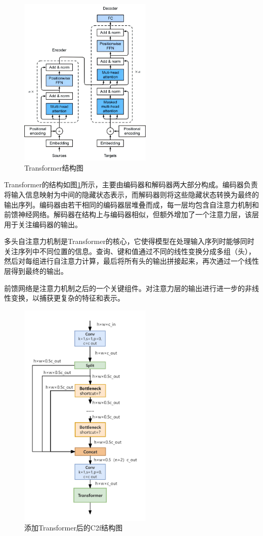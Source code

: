 \documentclass[journal]{IEEEtran}
\begin{document}
\begin{figure}
  \centering
  \includegraphics[width=2.5in]{./picture/transformer.jpg}
  \caption{Transformer结构图}
  \label{fig:Transformer}
\end{figure}

Transformer的结构如图\ref{fig:Transformer}所示，主要由编码器和解码器两大部分构成。编码器负责将输入信息映射为中间的隐藏状态表示，而解码器则将这些隐藏状态转换为最终的输出序列。编码器由若干相同的编码器层堆叠而成，每一层均包含自注意力机制和前馈神经网络。解码器在结构上与编码器相似，但额外增加了一个注意力层，该层用于关注编码器的输出。


多头自注意力机制是Transformer的核心，它使得模型在处理输入序列时能够同时关注序列中不同位置的信息。查询、键和值通过不同的线性变换分成多组（头），然后对每组进行自注意力计算，最后将所有头的输出拼接起来，再次通过一个线性层得到最终的输出。

前馈网络是注意力机制之后的一个关键组件。对注意力层的输出进行进一步的非线性变换，以捕获更复杂的特征和表示。

\begin{figure}
  \centering
  \includegraphics[width=2.5in]{./picture/C2f.png}
  \caption{添加Transformer后的C2f结构图}
  \label{fig:C2fr}
\end{figure}
\end{document}
